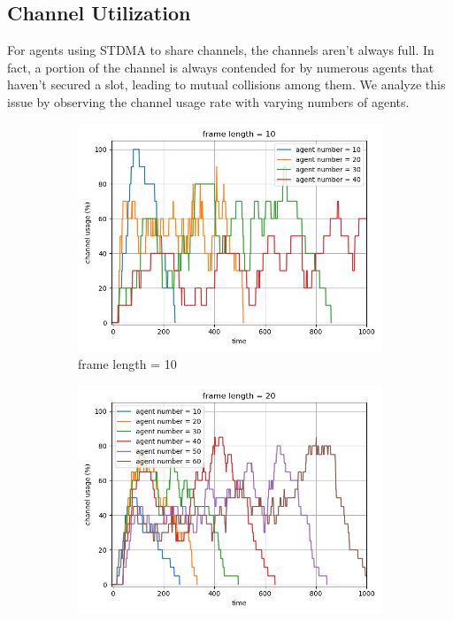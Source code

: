 \subsection{Channel Utilization}

For agents using STDMA to share channels, the channels aren't always full. In fact, a portion of the channel is always contended for by numerous agents that haven't secured a slot, leading to mutual collisions among them.
We analyze this issue by observing the channel usage rate with varying numbers of agents.

\begin{figure}[htbp]
    \centering
    \begin{subfigure}[t]{0.45\linewidth}
        \centering
        \includegraphics[width=\linewidth]{figures/channel_usage_frame10.png}
        \caption{frame length = 10}
        \label{fig:framepercent1}
    \end{subfigure}
    \hfill
    \begin{subfigure}[t]{0.45\linewidth}
        \centering
        \includegraphics[width=\linewidth]{figures/channel_usage_frame20.png}

\end{subfigure}
\end{figure}

